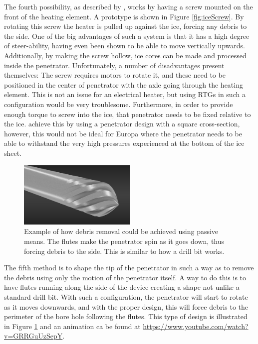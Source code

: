 \noindent
The fourth possibility, as described by \citet{article:dachwald2014a}, works by having a screw mounted on the front of the heating element. A prototype is shown in Figure \ref{fig:iceScrew}. By rotating this screw the heater is pulled up against the ice, forcing any debris to the side. One of the big advantages of such a system is that it has a high degree of steer-ability, having even been shown to be able to move vertically upwards\cite{article:dachwald2014a}.  
Additionally, by making the screw hollow, ice cores can be made and processed inside the penetrator. Unfortunately, a number of disadvantages present themselves: The screw requires motors to rotate it, and these need to be positioned in the center of penetrator with the axle going through the heating element. This is not an issue for an electrical heater, but using RTGs in such a configuration would be very troublesome. Furthermore, in order to provide enough torque to screw into the ice, that penetrator needs to be fixed relative to the ice. \citet{article:dachwald2014a} achieve this by using a penetrator design with a square cross-section, however, this would not be ideal for Europa where the penetrator needs to be able to withstand the very high pressures experienced at the bottom of the ice sheet.\\

 \begin{figure}[ht]
 	\centering
 	\includegraphics[width=0.5\textwidth]{figures/LAMC/flutedHead}
 	\caption{Example of how debris removal could be achieved using passive means. The flutes make the penetrator spin as it goes down, thus forcing debris to the side. This is similar to how a drill bit works.}
 	\label{fig:flutedHead}
 \end{figure}  

\noindent
The fifth method is to shape the tip of the penetrator in such a way as to remove the debris using only the motion of the penetrator itself. A way to do this is to have flutes running along the side of the device creating a shape not unlike a standard drill bit. With such a configuration, the penetrator will start to rotate as it moves downwards, and with the proper design, this will force debris to the perimeter of the bore hole following the flutes. This type of design is illustrated in Figure \ref{fig:flutedHead} and an animation ca be found at \url{https://www.youtube.com/watch?v=GRRGuUzSepY}.  \\

